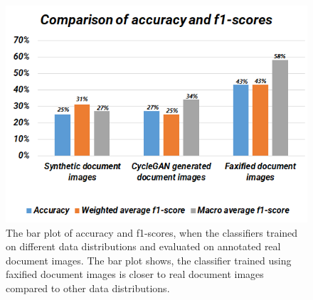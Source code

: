\begin{figure}[H]
        \begin{center}
	    \includegraphics[scale=1.0]{images/Evaluation/ComparisonOfAccuracyAndF1Score.png}
	    \caption[The bar plot of accuracy and f1-scores, when the classifiers trained on different data distributions and evaluated on annotated real document images.]{The bar plot of accuracy and f1-scores, when the classifiers trained on different data distributions and evaluated on annotated real document images. The bar plot shows, the classifier trained using faxified document images is closer to real document images compared to other data distributions.}
	    \label{fig:ComparisonOfAccuracyAndF1Score}
	    \end{center}
\end{figure}

















